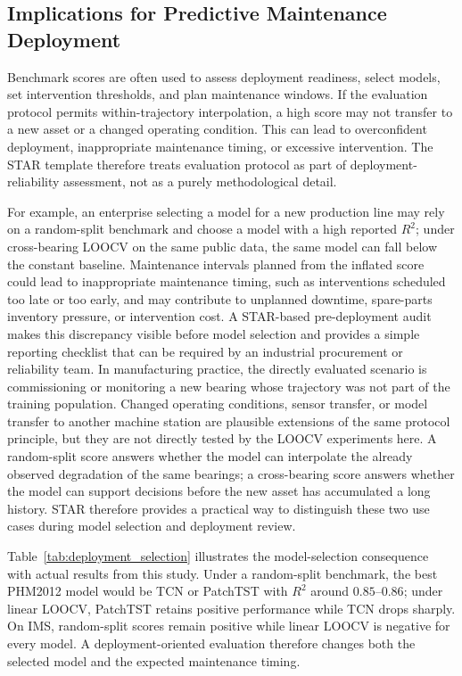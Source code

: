\documentclass[pdflatex,sn-mathphys-num]{sn-jnl}
\begin{document}
\subsection{Implications for Predictive Maintenance Deployment}
Benchmark scores are often used to assess deployment readiness, select models, set intervention thresholds, and plan maintenance windows. If the evaluation protocol permits within-trajectory interpolation, a high score may not transfer to a new asset or a changed operating condition. This can lead to overconfident deployment, inappropriate maintenance timing, or excessive intervention. The STAR template therefore treats evaluation protocol as part of deployment-reliability assessment, not as a purely methodological detail.

For example, an enterprise selecting a model for a new production line may rely on a random-split benchmark and choose a model with a high reported $R^2$; under cross-bearing LOOCV on the same public data, the same model can fall below the constant baseline. Maintenance intervals planned from the inflated score could lead to inappropriate maintenance timing, such as interventions scheduled too late or too early, and may contribute to unplanned downtime, spare-parts inventory pressure, or intervention cost. A STAR-based pre-deployment audit makes this discrepancy visible before model selection and provides a simple reporting checklist that can be required by an industrial procurement or reliability team. In manufacturing practice, the directly evaluated scenario is commissioning or monitoring a new bearing whose trajectory was not part of the training population. Changed operating conditions, sensor transfer, or model transfer to another machine station are plausible extensions of the same protocol principle, but they are not directly tested by the LOOCV experiments here. A random-split score answers whether the model can interpolate the already observed degradation of the same bearings; a cross-bearing score answers whether the model can support decisions before the new asset has accumulated a long history. STAR therefore provides a practical way to distinguish these two use cases during model selection and deployment review.

Table~\ref{tab:deployment_selection} illustrates the model-selection consequence with actual results from this study. Under a random-split benchmark, the best PHM2012 model would be TCN or PatchTST with $R^2$ around $0.85$--$0.86$; under linear LOOCV, PatchTST retains positive performance while TCN drops sharply. On IMS, random-split scores remain positive while linear LOOCV is negative for every model. A deployment-oriented evaluation therefore changes both the selected model and the expected maintenance timing.
\end{document}
